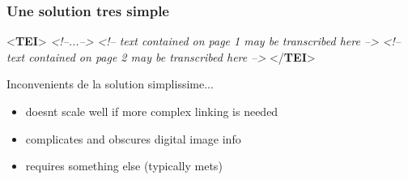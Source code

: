 \documentclass[]{beamer}\makeatletter
\begin{document}
\begin{frame}[fragile]
\frametitle{ Une solution tres simple}
\bgroup\ttfamily\fontsize{8.5pt}{9pt}\selectfont\par
\begin{exampleblock}{}
\noindent\ttfamily\mbox{}{\color{blue1}<\textbf{TEI}>}\mbox{}\newline 
{}\mbox{}\newline 
\textit{<!--...-->}\mbox{}\newline 
{}\mbox{}\newline 
{}\mbox{}\newline 
\hspace*{6pt}\mbox{}\newline 
\textit{<!-- text contained on page 1 may be transcribed here -->}\mbox{}\newline 
\hspace*{6pt}\mbox{}\newline 
\textit{<!-- text contained on page 2 may be transcribed here -->}\mbox{}\newline 
{}\mbox{}\newline 
{\color{blue1}</\textbf{TEI}>}
\end{exampleblock}
\par\egroup
  \par
Inconvenients de la solution simplissime... \begin{itemize}

\item doesnt scale well if more complex linking is needed 
\item complicates and obscures digital image info 
\item requires something else (typically mets) 
\end{itemize} 
\end{frame}
\end{document}
